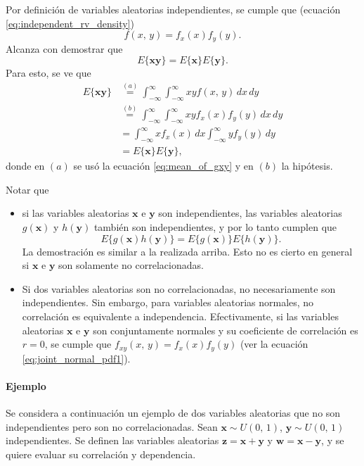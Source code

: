 \documentclass[a4paper]{report}
\newcommand{\x}{\mathbf{x}}
\newcommand{\y}{\mathbf{y}}
\newcommand{\w}{\mathbf{w}}
\newcommand{\z}{\mathbf{z}}
\begin{document}
Por definición de variables aleatorias independientes, se cumple que (ecuación \ref{eq:independent_rv_density})
\[
 f(x,\,y)=f_x(x)f_y(y).
\]
Alcanza con demostrar que 
\[
 E\{\x\y\}=E\{\x\}E\{\y\}.
\]
Para esto, se ve que
\begin{align*}
 E\{\x\y\}&\overset{(a)}{=}\int_{-\infty}^{\infty}\int_{-\infty}^{\infty}xyf(x,\,y)\,dx\,dy\\
  &\overset{(b)}{=}\int_{-\infty}^{\infty}\int_{-\infty}^{\infty}xyf_x(x)f_y(y)\,dx\,dy\\
  &=\int_{-\infty}^{\infty}xf_x(x)\,dx\int_{-\infty}^{\infty}yf_y(y)\,dy\\
  &=E\{\x\}E\{\y\},
\end{align*}
donde en \((a)\) se usó la ecuación \ref{eq:mean_of_gxy} y en \((b)\) la hipótesis.

Notar que
\begin{itemize}
 \item si las variables aleatorias \(\x\) e \(\y\) son independientes, las variables aleatorias \(g(\x)\) y \(h(\y)\) también son independientes, y por lo tanto cumplen que
 \begin{equation}\label{eq:independent_rv_mean_functions_product}
  E\{g(\x)h(\y)\}=E\{g(\x)\}E\{h(\y)\}.
 \end{equation}
 La demostración es similar a la realizada arriba. Esto no es cierto en general si \(\x\) e \(\y\) son solamente no correlacionadas.
 \item Si dos variables aleatorias son no correlacionadas, no necesariamente son independientes. Sin embargo, para variables aleatorias normales, no correlación es equivalente a independencia. Efectivamente, si las variables aleatorias \(\x\) e \(\y\) son conjuntamente normales y su coeficiente de correlación es \(r=0\), se cumple que \(f_{xy}(x,\,y)=f_x(x)f_y(y)\) (ver la ecuación \ref{eq:joint_normal_pdf1}).
\end{itemize}

\paragraph{Ejemplo} Se considera a continuación un ejemplo de dos variables aleatorias que no son independientes pero son no correlacionadas. Sean \(\x\sim U(0,\,1)\), \(\y\sim U(0,\,1)\) independientes. Se definen las variables aleatorias \(\z=\x+\y\) y \(\w=\x-\y\), y se quiere evaluar su correlación y dependencia.
\end{document}
